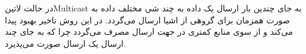 
در حالت ‌لاتین{Multicast} به جای چندین بار ارسال یک داده به چند شی مختلف داده به صورت
همزمان برای گروهی از اشیا ارسال می‌گردد. در این روش تاخیر بهبود پیدا می‌کند و از سوی منابع کمتری
در جهت ارسال مصرف می‌گردد چرا که به جای چند ارسال یک ارسال صورت می‌پذیرد.
